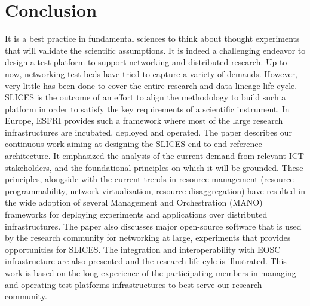 
\section{Conclusion}
\label{section:conclusion}
It is a best practice in fundamental sciences to think about thought experiments that will validate the scientific assumptions. It is indeed a challenging endeavor to design a test platform to support networking and distributed research. Up to now, networking test-beds have tried to capture a variety of demands. However, very little has been done to cover the entire research and data lineage life-cycle. SLICES is the outcome of an effort to align the methodology to build such a platform in order to satisfy the key requirements of a scientific instrument. In Europe, ESFRI provides such a framework where most of the large research infrastructures are incubated, deployed and operated. 
The paper describes our continuous work aiming at designing the SLICES end-to-end reference architecture. It emphasized the analysis of the current demand from relevant ICT stakeholders, and the foundational principles on which it will be grounded. These principles, alongside with the current trends in resource management (resource programmability, network virtualization, resource disaggregation) have resulted in the wide adoption of several Management and Orchestration (MANO) frameworks for deploying experiments and applications over distributed infrastructures. The paper also discusses major open-source software that is used by the research community for networking at large, experiments that provides opportunities for SLICES. The integration and interoperability with EOSC infrastructure are also presented and the research life-cyle is illustrated. This work is based on the long experience of the participating members in managing and operating test platforms infrastructures to best serve our research community.